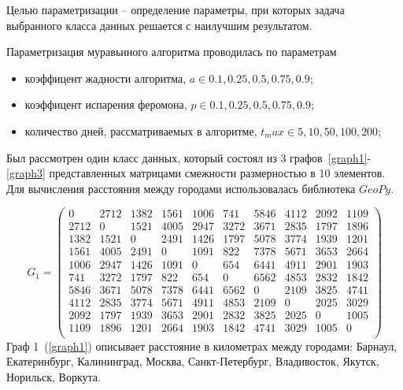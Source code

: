 Целью параметризации -- определение параметры, при которых задача выбранного класса данных решается с наилучшим результатом.

Параметризация муравьиного алгоритма проводилась по параметрам
\begin{itemize}
 	\item коэффицент жадности алгоритма,  $a \in {0.1, 0.25, 0.5, 0.75, 0.9}$;
 	\item коэффицент испарения феромона,  $p \in {0.1, 0.25, 0.5, 0.75, 0.9}$;
 	\item количество дней, рассматриваемых в алгоритме,  $t_max \in {5, 10, 50, 100, 200}$;
\end{itemize}

Был рассмотрен один класс данных, который состоял из 3 графов~\ref{graph1}-\ref{graph3} представленных матрицами смежности размерностью в 10 элементов. Для вычисления расстояния между городами использовалась библиотека $GeoPy$\cite{GeoPy}.

\begin{equation}
	\label{graph1}
	G_{1} = \begin{pmatrix}
		0 & 2712 & 1382 & 1561 & 1006 & 741 & 5846 & 4112 & 2092 & 1109 \\
		2712 & 0 & 1521 & 4005 & 2947 & 3272 & 3671 & 2835 & 1797 & 1896 \\
		1382 & 1521 & 0 & 2491 & 1426 & 1797 & 5078 & 3774 & 1939 & 1201 \\
		1561 & 4005 & 2491 & 0 & 1091 & 822 & 7378 & 5671 & 3653 & 2664 \\
		1006 & 2947 & 1426 & 1091 & 0 & 654 & 6441 & 4911 & 2901 & 1903 \\
		741 & 3272 & 1797 & 822 & 654 & 0 & 6562 & 4853 & 2832 & 1842 \\
		5846 & 3671 & 5078 & 7378 & 6441 & 6562 & 0 & 2109 & 3825 & 4741 \\
		4112 & 2835 & 3774 & 5671 & 4911 & 4853 & 2109 & 0 & 2025 & 3029 \\
		2092 & 1797 & 1939 & 3653 & 2901 & 2832 & 3825 & 2025 & 0 & 1005 \\
		1109 & 1896 & 1201 & 2664 & 1903 & 1842 & 4741 & 3029 & 1005 & 0 \\
	\end{pmatrix}
\end{equation}
Граф 1~(\ref{graph1}) описывает расстояние в километрах между городами: Барнаул, Екатеринбург, Калининград, Москва, Санкт-Петербург, Владивосток, Якутск, Норильск, Воркута.

